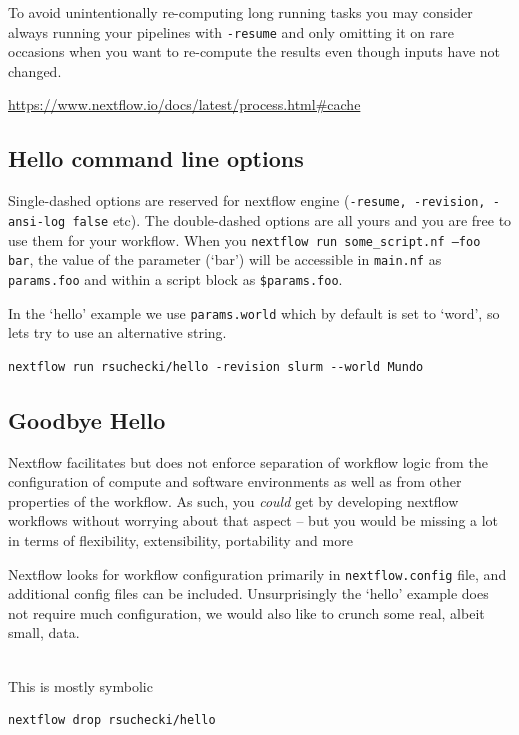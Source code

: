 To avoid unintentionally re-computing long running tasks you may consider 
always running your pipelines with \texttt{-resume} and only omitting it
on rare occasions when you want to re-compute the results
even though inputs have not changed. 

\url{https://www.nextflow.io/docs/latest/process.html#cache}

\subsection{Hello command line options}

Single-dashed options are reserved for nextflow engine (\texttt{-resume, -revision, -ansi-log false} etc). 
The double-dashed options are all yours and you are free to use them for your workflow. 
When you \texttt{nextflow run some\_script.nf --foo bar}, 
the value of the parameter (`bar')
will be accessible in \texttt{main.nf} as \texttt{params.foo}
and within a script block as \texttt{\$params.foo}.

\begin{steps}
In the `hello' example we use \texttt{params.world} which by default is set to `word', so lets try to use an alternative string.

\begin{lstlisting}
nextflow run rsuchecki/hello -revision slurm --world Mundo
\end{lstlisting}
\end{steps}

\subsection{Goodbye Hello}


Nextflow facilitates but does not enforce separation of workflow logic from the configuration
of compute and software environments as well as from other properties of the workflow.  
As such, you \textit{could} get by developing nextflow workflows without worrying about that 
aspect -- but you would be missing a lot in terms of flexibility, extensibility, portability and more

Nextflow looks for workflow configuration primarily in \texttt{nextflow.config} file, and additional config files can be included. Unsurprisingly the `hello' example does not require much configuration,
we would also like to crunch some real, albeit small, data.


\begin{steps}
\\This is mostly symbolic
\begin{lstlisting}
nextflow drop rsuchecki/hello
\end{lstlisting}
\end{steps}


